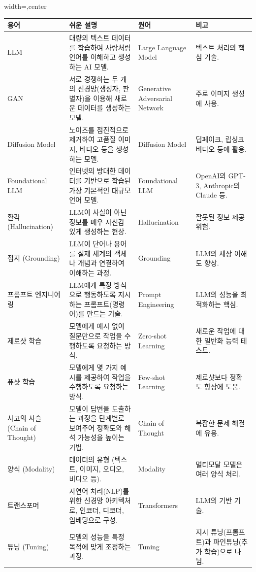 \documentclass[11pt,a4paper]{article}
\theoremstyle{definition}
\begin{document}
\begin{adjustbox}{width=\textwidth,center}
\begin{tabular}{llll}
\toprule
\textbf{용어} & \textbf{쉬운 설명} & \textbf{원어} & \textbf{비고} \\
\midrule
LLM & 대량의 텍스트 데이터를 학습하여 사람처럼 언어를 이해하고 생성하는 AI 모델. & Large Language Model & 텍스트 처리의 핵심 기술. \\
GAN & 서로 경쟁하는 두 개의 신경망(생성자, 판별자)을 이용해 새로운 데이터를 생성하는 모델. & Generative Adversarial Network & 주로 이미지 생성에 사용. \\
Diffusion Model & 노이즈를 점진적으로 제거하여 고품질 이미지, 비디오 등을 생성하는 모델. & Diffusion Model & 딥페이크, 립싱크 비디오 등에 활용. \\
Foundational LLM & 인터넷의 방대한 데이터를 기반으로 학습된 가장 기본적인 대규모 언어 모델. & Foundational LLM & OpenAI의 GPT-3, Anthropic의 Claude 등. \\
환각 (Hallucination) & LLM이 사실이 아닌 정보를 매우 자신감 있게 생성하는 현상. & Hallucination & 잘못된 정보 제공 위험. \\
접지 (Grounding) & LLM이 단어나 용어를 실제 세계의 객체나 개념과 연결하여 이해하는 과정. & Grounding & LLM의 세상 이해도 향상. \\
프롬프트 엔지니어링 & LLM에게 특정 방식으로 행동하도록 지시하는 프롬프트(명령어)를 만드는 기술. & Prompt Engineering & LLM의 성능을 최적화하는 핵심. \\
제로샷 학습 & 모델에게 예시 없이 질문만으로 작업을 수행하도록 요청하는 방식. & Zero-shot Learning & 새로운 작업에 대한 일반화 능력 테스트. \\
퓨샷 학습 & 모델에게 몇 가지 예시를 제공하여 작업을 수행하도록 요청하는 방식. & Few-shot Learning & 제로샷보다 정확도 향상에 도움. \\
사고의 사슬 (Chain of Thought) & 모델이 답변을 도출하는 과정을 단계별로 보여주어 정확도와 해석 가능성을 높이는 기법. & Chain of Thought & 복잡한 문제 해결에 유용. \\
양식 (Modality) & 데이터의 유형 (텍스트, 이미지, 오디오, 비디오 등). & Modality & 멀티모달 모델은 여러 양식 처리. \\
트랜스포머 & 자연어 처리(NLP)를 위한 신경망 아키텍처로, 인코더, 디코더, 임베딩으로 구성. & Transformers & LLM의 기반 기술. \\
튜닝 (Tuning) & 모델의 성능을 특정 목적에 맞게 조정하는 과정. & Tuning & 지시 튜닝(프롬프트)과 파인튜닝(추가 학습)으로 나뉨. \\

\end{tabular}
\end{adjustbox}
\end{document}
